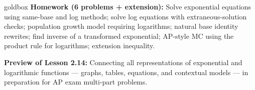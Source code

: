 \documentclass[10pt]{article}
\begin{document}
\begin{skillbox}{goldbox}
\textbf{Homework (6 problems + extension):} Solve exponential equations using same-base
and log methods; solve log equations with extraneous-solution checks; population growth
model requiring logarithms; natural base identity rewrites; find inverse of a transformed
exponential; AP-style MC using the product rule for logarithms; extension inequality.

\textbf{Preview of Lesson 2.14:} Connecting all representations of exponential and
logarithmic functions --- graphs, tables, equations, and contextual models --- in preparation
for AP exam multi-part problems.
\end{skillbox}
\end{document}
